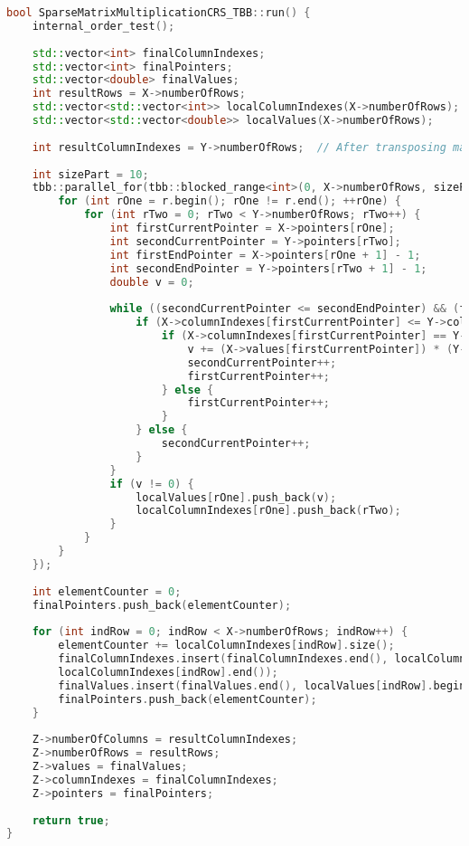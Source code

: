 \documentclass[a4paper, 14pt]{article}
\theoremstyle{plain}
\begin{document}
\begin{lstlisting}[language=C++,caption=Реализация метода run() в параллельной (TBB) версии программы]
bool SparseMatrixMultiplicationCRS_TBB::run() {
	internal_order_test();
	
	std::vector<int> finalColumnIndexes;
	std::vector<int> finalPointers;
	std::vector<double> finalValues;
	int resultRows = X->numberOfRows;
	std::vector<std::vector<int>> localColumnIndexes(X->numberOfRows);
	std::vector<std::vector<double>> localValues(X->numberOfRows);
	
	int resultColumnIndexes = Y->numberOfRows;  // After transposing matrix Y
	
	int sizePart = 10;
	tbb::parallel_for(tbb::blocked_range<int>(0, X->numberOfRows, sizePart), [&](tbb::blocked_range<int> r) {
		for (int rOne = r.begin(); rOne != r.end(); ++rOne) {
			for (int rTwo = 0; rTwo < Y->numberOfRows; rTwo++) {
				int firstCurrentPointer = X->pointers[rOne];
				int secondCurrentPointer = Y->pointers[rTwo];
				int firstEndPointer = X->pointers[rOne + 1] - 1;
				int secondEndPointer = Y->pointers[rTwo + 1] - 1;
				double v = 0;
				
				while ((secondCurrentPointer <= secondEndPointer) && (firstCurrentPointer <= firstEndPointer)) {
					if (X->columnIndexes[firstCurrentPointer] <= Y->columnIndexes[secondCurrentPointer]) {
						if (X->columnIndexes[firstCurrentPointer] == Y->columnIndexes[secondCurrentPointer]) {
							v += (X->values[firstCurrentPointer]) * (Y->values[secondCurrentPointer]);
							secondCurrentPointer++;
							firstCurrentPointer++;
						} else {
							firstCurrentPointer++;
						}
					} else {
						secondCurrentPointer++;
					}
				}
				if (v != 0) {
					localValues[rOne].push_back(v);
					localColumnIndexes[rOne].push_back(rTwo);
				}
			}
		}
	});
	
	int elementCounter = 0;
	finalPointers.push_back(elementCounter);
	
	for (int indRow = 0; indRow < X->numberOfRows; indRow++) {
		elementCounter += localColumnIndexes[indRow].size();
		finalColumnIndexes.insert(finalColumnIndexes.end(), localColumnIndexes[indRow].begin(),
		localColumnIndexes[indRow].end());
		finalValues.insert(finalValues.end(), localValues[indRow].begin(), localValues[indRow].end());
		finalPointers.push_back(elementCounter);
	}
	
	Z->numberOfColumns = resultColumnIndexes;
	Z->numberOfRows = resultRows;
	Z->values = finalValues;
	Z->columnIndexes = finalColumnIndexes;
	Z->pointers = finalPointers;
	
	return true;
}
\end{lstlisting}
\end{document}
